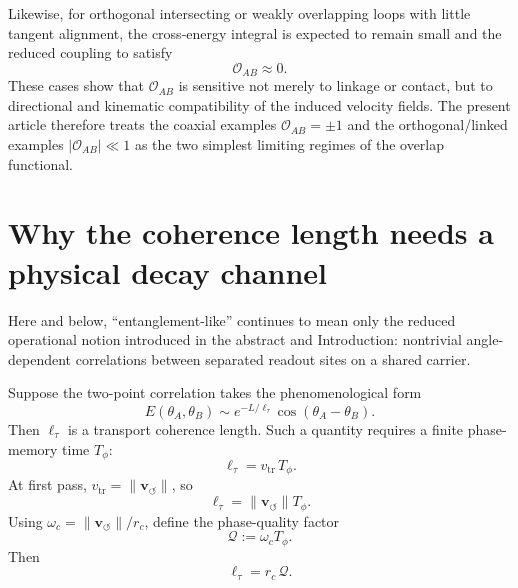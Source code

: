 \documentclass[11pt]{article}
\newcommand{\vnorm}{\lVert \mathbf{v}_{\!\boldsymbol{\circlearrowleft}}\rVert}
\newcommand{\rc}{r_c}
\begin{document}
            Likewise, for orthogonal intersecting or weakly overlapping loops with little tangent alignment, the cross-energy integral is expected to remain small and the reduced coupling to satisfy
            \begin{equation}
                \mathcal{O}_{AB}\approx 0.
            \end{equation}
            These cases show that \(\mathcal{O}_{AB}\) is sensitive not merely to linkage or contact, but to directional and kinematic compatibility of the induced velocity fields. The present article therefore treats the coaxial examples \(\mathcal{O}_{AB}=\pm 1\) and the orthogonal/linked examples \(|\mathcal{O}_{AB}|\ll 1\) as the two simplest limiting regimes of the overlap functional.
    
    \section{Why the coherence length needs a physical decay channel}
        
        Here and below, ``entanglement-like'' continues to mean only the reduced operational notion introduced in the abstract and Introduction: nontrivial angle-dependent correlations between separated readout sites on a shared carrier.

        Suppose the two-point correlation takes the phenomenological form
        \begin{equation}
            E(\theta_A,\theta_B)
            \sim
            e^{-L/\ell_\tau}\cos(\theta_A-\theta_B).
            \label{eq:E_decay}
        \end{equation}
        Then \(\ell_\tau\) is a transport coherence length. Such a quantity requires a finite phase-memory time \(T_\phi\):
        \begin{equation}
            \ell_\tau=v_{\mathrm{tr}}\,T_\phi.
            \label{eq:l_tau_Tphi}
        \end{equation}
        At first pass, \(v_{\mathrm{tr}}=\vnorm\), so
        \begin{equation}
            \ell_\tau=\vnorm T_\phi.
        \end{equation}
        Using \(\omega_c=\vnorm/\rc\), define the phase-quality factor
        \begin{equation}
            \mathcal{Q}:=\omega_c T_\phi.
            \label{eq:Qdef}
        \end{equation}
        Then
        \begin{equation}
            \boxed{
                \ell_\tau=\rc\,\mathcal{Q}.
            }
            \label{eq:l_tau_Q}
        \end{equation}
        
\end{document}
